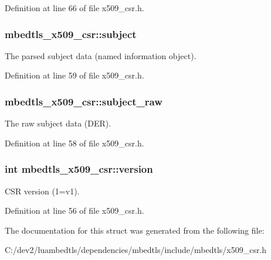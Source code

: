 Definition at line 66 of file x509\-\_\-csr.\-h.

\hypertarget{structmbedtls__x509__csr_a0c403df635495f8cba9b3e1001fc4491}{
\subsubsection[{subject}]{ mbedtls\-\_\-x509\-\_\-csr\-::subject}}\label{structmbedtls__x509__csr_a0c403df635495f8cba9b3e1001fc4491}
The parsed subject data (named information object). 

Definition at line 59 of file x509\-\_\-csr.\-h.

\hypertarget{structmbedtls__x509__csr_ad85a7b3987a80254911b8d48a1beb78f}{
\subsubsection[{subject\-\_\-raw}]{ mbedtls\-\_\-x509\-\_\-csr\-::subject\-\_\-raw}}\label{structmbedtls__x509__csr_ad85a7b3987a80254911b8d48a1beb78f}
The raw subject data (D\-E\-R). 

Definition at line 58 of file x509\-\_\-csr.\-h.

\hypertarget{structmbedtls__x509__csr_a455e44fb96cdcd346788e0a41d7ab2b5}{
\subsubsection[{version}]{\setlength{\rightskip}{0pt plus 5cm}int mbedtls\-\_\-x509\-\_\-csr\-::version}}\label{structmbedtls__x509__csr_a455e44fb96cdcd346788e0a41d7ab2b5}
C\-S\-R version (1=v1). 

Definition at line 56 of file x509\-\_\-csr.\-h.



The documentation for this struct was generated from the following file\-:\begin{DoxyCompactItemize}
\item 
C\-:/dev2/luambedtls/dependencies/mbedtls/include/mbedtls/x509\-\_\-csr.\-h\end{DoxyCompactItemize}
